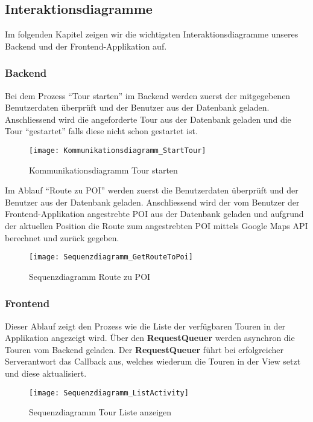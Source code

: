 \subsection{Interaktionsdiagramme}\label{interaktionsdiagramme}
Im folgenden Kapitel zeigen wir die wichtigsten Interaktionsdiagramme unseres Backend und der Frontend-Applikation auf.

\subsubsection{Backend}\label{backend}

Bei dem Prozess ``Tour starten'' im Backend werden zuerst der mitgegebenen Benutzerdaten
überprüft und der Benutzer aus der Datenbank geladen. Anschliessend wird die angeforderte
Tour aus der Datenbank geladen und die Tour ``gestartet'' falls diese nicht schon gestartet ist.

\begin{figure}
  \centering
  \texttt{[image: Kommunikationsdiagramm\_StartTour]}
  \caption{Kommunikationsdiagramm Tour starten}
\end{figure}

Im Ablauf ``Route zu POI'' werden zuerst die Benutzerdaten überprüft und der Benutzer aus
der Datenbank geladen. Anschliessend wird der vom Benutzer der Frontend-Applikation angestrebte
POI aus der Datenbank geladen und aufgrund der aktuellen Position die Route zum angestrebten
POI mittels Google Maps API berechnet und zurück gegeben.

\begin{figure}
  \centering
  \texttt{[image: Sequenzdiagramm\_GetRouteToPoi]}
  \caption{Sequenzdiagramm Route zu POI}
\end{figure}

\subsubsection{Frontend}\label{frontend}
\label{frontend-listactivity}
Dieser Ablauf zeigt den Prozess wie die Liste der verfügbaren Touren in der Applikation
angezeigt wird. Über den \textbf{RequestQueuer} werden asynchron die Touren vom Backend geladen.
Der \textbf{RequestQueuer} führt bei erfolgreicher Serverantwort das Callback aus, welches
wiederum die Touren in der View setzt und diese aktualisiert.

\begin{figure}
  \texttt{[image: Sequenzdiagramm\_ListActivity]}
  \caption{Sequenzdiagramm Tour Liste anzeigen}
\end{figure}

